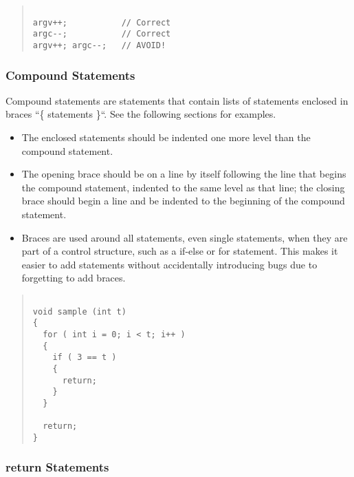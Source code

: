\documentclass{article}
\begin{document}
\begin{quote}
\begin{verbatim}

argv++;           // Correct 
argc--;           // Correct 
argv++; argc--;   // AVOID! 

\end{verbatim}
\end{quote}


\subsubsection{Compound Statements}

Compound statements are statements that contain lists of statements
enclosed in braces ``\{ statements \}``. See the following sections
for examples.


\begin{itemize}
\item The enclosed statements should be indented one more level than
      the compound statement.  

\item The opening brace should be on a line by itself following the
      line that begins the compound statement, indented to the same
      level as that line; the closing brace should begin a line and be
      indented to the beginning of the compound statement.

\item Braces are used around all statements, even single statements,
      when they are part of a control structure, such as a if-else or
      for statement. This makes it easier to add statements without
      accidentally introducing bugs due to forgetting to add braces.

\end{itemize}
 
\begin{quote}
\begin{verbatim}

void sample (int t)
{
  for ( int i = 0; i < t; i++ )
  {
    if ( 3 == t )
    {
      return;
    }
  }

  return;
}

\end{verbatim}
\end{quote}

\subsubsection{return Statements}
\end{document}
